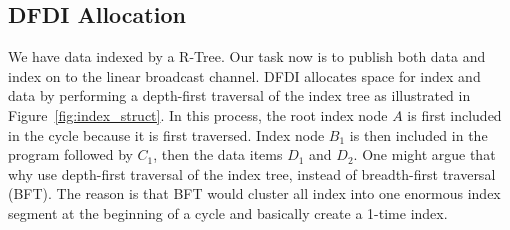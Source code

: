 \documentclass{sig-alternate}
\begin{document}
%
%
%
%

\subsection{DFDI Allocation}

We have data indexed by a R-Tree. Our task now is to publish both data and
index on to the linear broadcast channel. DFDI allocates space for index
and data by performing a depth-first traversal of the index tree
as illustrated in Figure~\ref{fig:index_struct}. In this process, the root
index node $A$ is first included in the
cycle because it is first traversed. Index node $B_1$ is then included
in the program followed by $C_1$, then the data items $D_1$ and $D_2$.
One might argue that why use depth-first traversal of the index tree,
instead of breadth-first traversal (BFT). The reason is that BFT would
cluster all index into one enormous index segment at the beginning of a
cycle and basically create a 1-time index.
\end{document}
